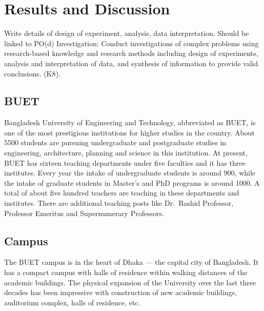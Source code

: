 \chapter{Results and Discussion}
Write details of design of experiment, analysis, data interpretation. Should be linked to PO(d) Investigation: Conduct investigations of complex problems using research-based knowledge and research methods including design of experiments, analysis and interpretation of data, and synthesis of information to provide valid conclusions. (K8).

\section{BUET}
Bangladesh University of Engineering and Technology, abbreviated as
BUET, is one of the most prestigious institutions for
higher studies in the country. About 5500 students are pursuing
undergraduate and
postgraduate studies in engineering,
architecture, planning and science in this institution. At present,
BUET has sixteen teaching departments under five faculties and it has
three institutes. Every year the intake of undergraduate students is
around 900, while the intake of graduate students in Master's and PhD
programs is around 1000. A total of about five hundred teachers are
teaching in these departments and institutes. There are additional
teaching posts like Dr.\ Rashid Professor, Professor Emeritus and
Supernumerary Professors.
 
\section{Campus}
The BUET campus is in the heart of Dhaka --- the capital
city of Bangladesh. It has a compact campus with halls of residence
within walking distances of the academic buildings. The physical
expansion of the University over the last three decades has been
impressive with construction of new academic buildings,
auditorium complex, halls of residence, etc.
 
